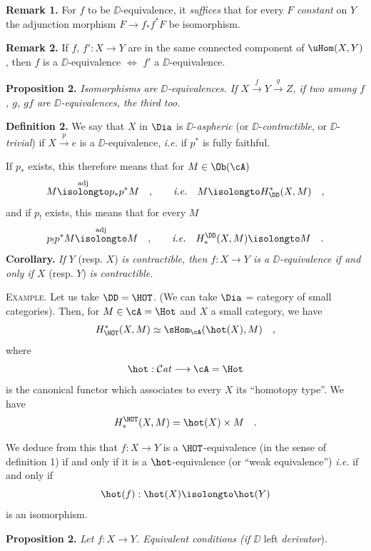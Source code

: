 \noindent\textbf{Remark 1.} For $f$ to be $\DD$-equivalence, it \textit{suffices} that for every $F$ \textit{constant} on $Y$ the adjunction morphism $F \to f_*f^*F$ be isomorphism.

\noindent\textbf{Remark 2.} If $f$, $f' : X \to Y$ are in the same connected component of $\uHom(X, Y)$, then $f$ is a $\DD$-equivalence $\Leftrightarrow$ $f'$ a $\DD$-equivalence.

\noindent\textbf{Proposition 2.} \textit{Isomorphisms are $\DD$-equivalences. If $X \overset{f}{\to} Y \overset{g}{\to} Z$, if two among $f$, $g$, $gf$ are $\DD$-equivalences, the third too.} %

\noindent\textbf{Definition 2.} We say that $X$ in $\Dia$ is $\DD$-\textit{aspheric} (or $\DD$-\textit{contractible}, or $\DD$-\textit{trivial}) if $X \overset{p}{\to} e$ is a $\DD$-equivalence, \textit{i.e.} if $p^*$ is fully faithful.

If $p_*$ exists, this therefore means that for $M \in \Ob(\cA)$
\[
M \overset{\mathrm{adj}}{\isolongto} p_*p^*M \quad , \qquad \textit{i.e.} \quad M \isolongto H^*_{\DD}(X, M) \quad ,
\]
and if $p_!$ exists, this means that for every $M$
\[
p_!p^*M \overset{\mathrm{adj}}{\isolongto} M \quad , \qquad \textit{i.e.} \quad H^{\DD}_*(X, M) \isolongto M \quad .
\]
\textbf{Corollary.} \textit{If $Y$} (resp. $X$) \textit{is contractible, then $f : X \to Y$ is a $\DD$-equivalence if and only if $X$} (resp. $Y$) \textit{is contractible.}

\noindent\textsc{Example}. Let us take $\DD = \HOT$. (We can take $\Dia$ = category of small categories). Then, for $M \in \cA = \Hot$ and $X$ a small category, we have
\[
H^*_{\HOT}(X, M) \simeq \sHom_{\cA}(\hot(X), M) \quad ,
\]
where
\[
\hot : \mathcal{C}\mathit{at} \longrightarrow \cA = \Hot
\]
is the canonical functor which associates to every $X$ its ``homotopy type''. We have
\[
H^{\HOT}_*(X, M) = \hot(X) \times M \quad .
\]

\noindent{}

\noindent We deduce from this that $f : X \to Y$ is a $\HOT$-equivalence (in the sense of definition 1) if and only if it is a $\hot$-equivalence (or ``weak equivalence'') \textit{i.e.} if and only if
\[
\hot(f) : \hot(X) \isolongto \hot(Y)
\]
is an isomorphism.

\noindent\textbf{Proposition 2.} \textit{Let $f : X \to Y$. Equivalent conditions (if $\DD$} left \textit{derivator}). %

